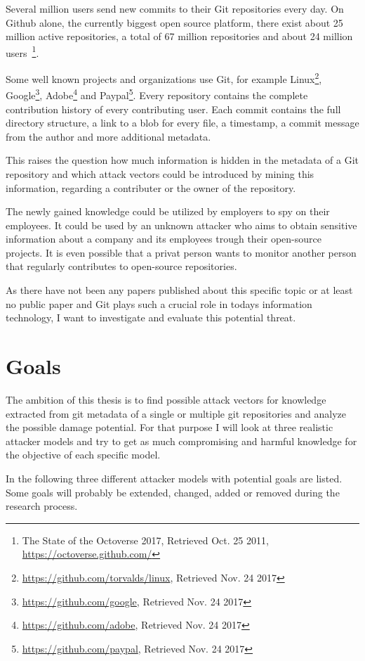 \documentclass[
  twoside,
  11pt, a4paper,
  footinclude=true,
  headinclude=true,
  cleardoublepage=empty
]{scrreprt}
\begin{document}
Several million users send new commits to their Git repositories every day.
On Github alone, the currently biggest open source platform, there exist about 25 million active repositories, a total of 67 million repositories and about 24 million users~\footnote{The State of the Octoverse 2017, Retrieved Oct. 25 2011, \url{https://octoverse.github.com/}}.

Some well known projects and organizations use Git, for example Linux\footnote{\url{https://github.com/torvalds/linux}, Retrieved Nov. 24 2017}, Google\footnote{\url{https://github.com/google}, Retrieved Nov. 24 2017}, Adobe\footnote{\url{https://github.com/adobe}, Retrieved Nov. 24 2017} and Paypal\footnote{\url{https://github.com/paypal}, Retrieved Nov. 24 2017}.
Every repository contains the complete contribution history of every contributing user.
Each commit contains the full directory structure, a link to a blob for every file, a timestamp, a commit message from the author and more additional metadata.

This raises the question how much information is hidden in the metadata of a Git repository and which attack vectors could be introduced by mining this information, regarding a contributer or the owner of the repository.

The newly gained knowledge could be utilized by employers to spy on their employees.
It could be used by an unknown attacker who aims to obtain sensitive information about a company and its employees trough their open-source projects.
It is even possible that a privat person wants to monitor another person that regularly contributes to open-source repositories.


As there have not been any papers published about this specific topic or at least no public paper and Git plays such a crucial role in todays information technology, I want to investigate and evaluate this potential threat.


\chapter{Goals}

The ambition of this thesis is to find possible attack vectors for knowledge extracted from git metadata of a single or multiple git repositories and analyze the possible damage potential.
For that purpose I will look at three realistic attacker models and try to get as much compromising and harmful knowledge for the objective of each specific model.

In the following three different attacker models with potential goals are listed.
Some goals will probably be extended, changed, added or removed during the research process.
\end{document}

